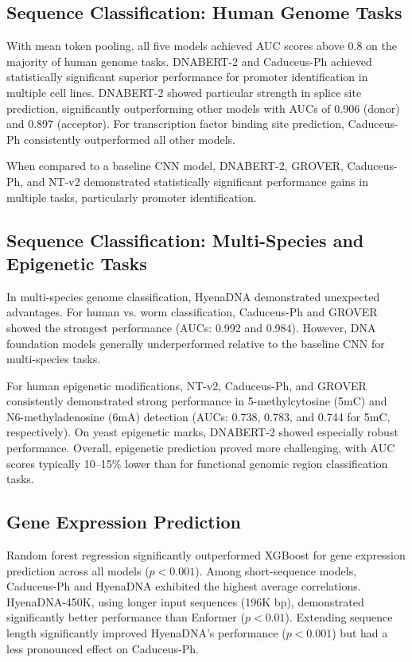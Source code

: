 \documentclass[11pt]{article}
\begin{document}
\subsection{Sequence Classification: Human Genome Tasks}

With mean token pooling, all five models achieved AUC scores above 0.8 on the majority of human genome tasks. DNABERT-2 and Caduceus-Ph achieved statistically significant superior performance for promoter identification in multiple cell lines. DNABERT-2 showed particular strength in splice site prediction, significantly outperforming other models with AUCs of 0.906 (donor) and 0.897 (acceptor). For transcription factor binding site prediction, Caduceus-Ph consistently outperformed all other models.

When compared to a baseline CNN model, DNABERT-2, GROVER, Caduceus-Ph, and NT-v2 demonstrated statistically significant performance gains in multiple tasks, particularly promoter identification.

\subsection{Sequence Classification: Multi-Species and Epigenetic Tasks}

In multi-species genome classification, HyenaDNA demonstrated unexpected advantages. For human vs. worm classification, Caduceus-Ph and GROVER showed the strongest performance (AUCs: 0.992 and 0.984). However, DNA foundation models generally underperformed relative to the baseline CNN for multi-species tasks.

For human epigenetic modifications, NT-v2, Caduceus-Ph, and GROVER consistently demonstrated strong performance in 5-methylcytosine (5mC) and N6-methyladenosine (6mA) detection (AUCs: 0.738, 0.783, and 0.744 for 5mC, respectively). On yeast epigenetic marks, DNABERT-2 showed especially robust performance. Overall, epigenetic prediction proved more challenging, with AUC scores typically 10--15\% lower than for functional genomic region classification tasks.

\subsection{Gene Expression Prediction}

Random forest regression significantly outperformed XGBoost for gene expression prediction across all models ($p < 0.001$). Among short-sequence models, Caduceus-Ph and HyenaDNA exhibited the highest average correlations. HyenaDNA-450K, using longer input sequences (196K bp), demonstrated significantly better performance than Enformer ($p < 0.01$). Extending sequence length significantly improved HyenaDNA's performance ($p < 0.001$) but had a less pronounced effect on Caduceus-Ph.
\end{document}
